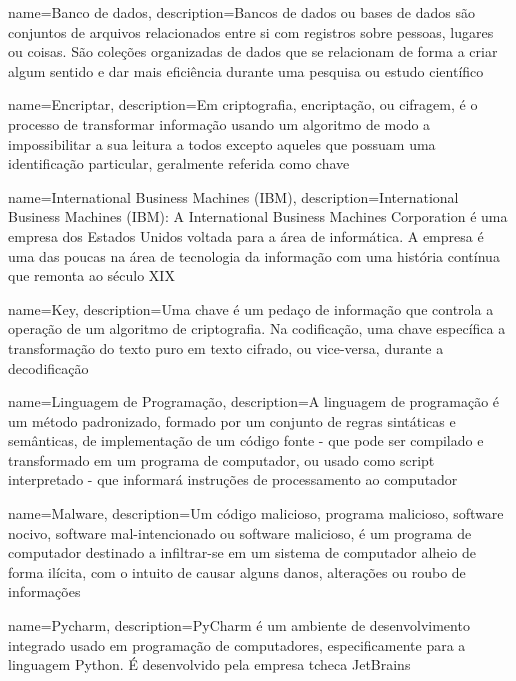 \makeglossaries
    {
    name={Banco de dados},
    description={Bancos de dados ou bases de dados são conjuntos de arquivos relacionados entre si com registros sobre pessoas, lugares ou coisas. São coleções organizadas de dados que se relacionam de forma a criar algum sentido e dar mais eficiência durante uma pesquisa ou estudo científico} 
    }

    {
    name={Encriptar},
    description={Em criptografia, encriptação, ou cifragem, é o processo de transformar informação usando um algoritmo de modo a impossibilitar a sua leitura a todos excepto aqueles que possuam uma identificação particular, geralmente referida como chave} 
    }

    {
    name={International Business Machines (IBM)},
    description={International Business Machines (IBM): A International Business Machines Corporation é uma empresa dos Estados Unidos voltada para a área de informática. A empresa é uma das poucas na área de tecnologia da informação com uma história
contínua que remonta ao século XIX} 
    }

    {
    name={Key},
    description={Uma chave é um pedaço de informação que controla a operação de um algoritmo de criptografia. Na codificação, uma chave específica a transformação do texto puro em texto cifrado, ou vice-versa, durante a decodificação} 
    }

    {
    name={Linguagem de Programação},
    description={A linguagem de programação é um método padronizado, formado por um conjunto de regras sintáticas e semânticas, de implementação de um código fonte - que pode ser compilado e transformado em um programa de computador, ou usado como script interpretado - que informará instruções de processamento ao computador} 
    }
    
    {
    name={Malware},
    description={Um código malicioso, programa malicioso, software nocivo, software mal-intencionado ou software malicioso, é um programa de computador destinado a infiltrar-se em um sistema de computador alheio de forma ilícita, com o intuito de causar alguns danos, alterações ou roubo de informações} 
    }

    {
    name={Pycharm},
    description={PyCharm é um ambiente de desenvolvimento integrado usado em programação de computadores, especificamente para a linguagem Python. É desenvolvido pela empresa tcheca JetBrains} 
    }

